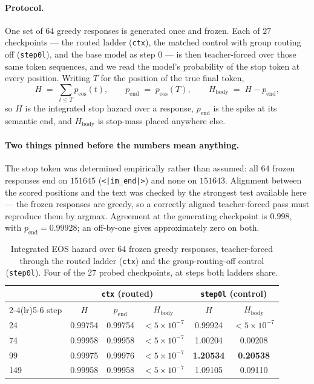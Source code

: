 \paragraph{Protocol.} One set of $64$ greedy responses is generated once and frozen. Each of
$27$ checkpoints --- the routed ladder (\texttt{ctx}), the matched control with group routing
off (\texttt{step0l}), and the base model as step $0$ --- is then teacher-forced over those
same token sequences, and we read the model's probability of the stop token at every position.
Writing $T$ for the position of the true final token,
%
\[
  H \;=\; \sum_{t \le T} p_{\mathrm{eos}}(t),
  \qquad
  p_{\mathrm{end}} \;=\; p_{\mathrm{eos}}(T),
  \qquad
  H_{\mathrm{body}} \;=\; H - p_{\mathrm{end}} ,
\]
%
so $H$ is the integrated stop hazard over a response, $p_{\mathrm{end}}$ is the spike at its
semantic end, and $H_{\mathrm{body}}$ is stop-mass placed anywhere else.

\paragraph{Two things pinned before the numbers mean anything.} The stop token was determined
empirically rather than assumed: all $64$ frozen responses end on $151645$
(\texttt{<|im\_end|>}) and none on $151643$. Alignment between the scored positions and the
text was checked by the strongest test available here --- the frozen responses are greedy, so
a correctly aligned teacher-forced pass must reproduce them by argmax. Agreement at the
generating checkpoint is $0.998$, with $p_{\mathrm{end}} = 0.99928$; an off-by-one gives
approximately zero on both.

\begin{table}[t]
\centering\small
\caption{Integrated EOS hazard over $64$ frozen greedy responses, teacher-forced through the
routed ladder (\texttt{ctx}) and the group-routing-off control (\texttt{step0l}). Four of the
$27$ probed checkpoints, at steps both ladders share.}
\label{tab:eos}
\begin{tabular}{lccccc}
\toprule
 & \multicolumn{3}{c}{\texttt{ctx} (routed)} & \multicolumn{2}{c}{\texttt{step0l} (control)} \\
\cmidrule(lr){2-4}\cmidrule(lr){5-6}
step & $H$ & $p_{\mathrm{end}}$ & $H_{\mathrm{body}}$ & $H$ & $H_{\mathrm{body}}$ \\
\midrule
24  & 0.99754 & 0.99754 & $<5\times10^{-7}$ & 0.99924 & $<5\times10^{-7}$ \\
74  & 0.99958 & 0.99958 & $<5\times10^{-7}$ & 1.00204 & 0.00208 \\
99  & 0.99975 & 0.99976 & $<5\times10^{-7}$ & \textbf{1.20534} & \textbf{0.20538} \\
149 & 0.99958 & 0.99958 & $<5\times10^{-7}$ & 1.09105 & 0.09110 \\
\bottomrule
\end{tabular}
\end{table}

